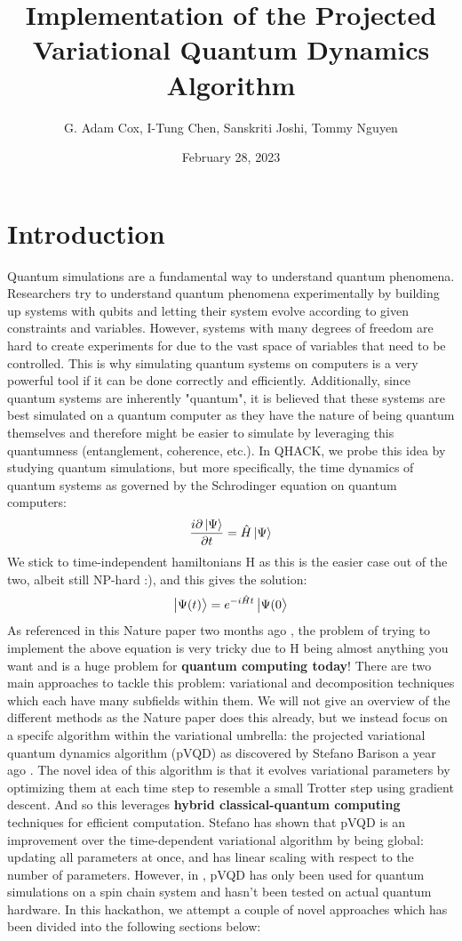 \documentclass{article}
\title{Implementation of the Projected Variational Quantum Dynamics Algorithm}
\author{G. Adam Cox, I-Tung Chen, Sanskriti Joshi, Tommy Nguyen}
\date{February 28, 2023}
\begin{document}
\maketitle

\section{Introduction}
Quantum simulations are a fundamental way to understand quantum phenomena. Researchers try to understand quantum phenomena experimentally by building up systems with qubits and letting their system evolve according to given constraints and variables. However, systems with many degrees of freedom are hard to create experiments for due to the vast space of variables that need to be controlled. This is why simulating quantum systems on computers is a very powerful tool if it can be done correctly and efficiently. Additionally, since quantum systems are inherently "quantum", it is believed that these systems are best simulated on a quantum computer as they have the nature of being quantum themselves and therefore might be easier to simulate by leveraging this quantumness (entanglement, coherence, etc.). In QHACK, we probe this idea by studying quantum simulations, but more specifically, the time dynamics of quantum systems as governed by the Schrodinger equation on quantum computers:
\begin{equation}\label{schro}
    \frac{i \partial\ket{\Psi}}{\partial t} = \hat{H} \ket{\Psi}
\end{equation}
We stick to time-independent hamiltonians H as this is the easier case out of the two, albeit still NP-hard :), and this gives the solution:
\begin{equation}\label{timeevo}
    \ket{\Psi(t)} = e^{-i\hat{H}t}\ket{\Psi(0}
\end{equation}
As referenced in this Nature paper two months ago \cite{nature_2021}, the problem of trying to implement the above equation is very tricky due to H being almost anything you want and is a huge problem for \textbf{quantum computing today}! There are two main approaches to tackle this problem: variational and decomposition techniques which each have many subfields within them. We will not give an overview of the different methods as the Nature paper does this already, but we instead focus on a specifc algorithm within the variational umbrella: the projected variational quantum dynamics algorithm (pVQD) as discovered by Stefano Barison a year ago \cite{Barison_2021}. The novel idea of this algorithm is that it evolves variational parameters by optimizing them at each time step to resemble a small Trotter step using gradient descent. And so this leverages \textbf{hybrid classical-quantum computing} techniques for efficient computation. Stefano has shown that pVQD is an improvement over the time-dependent variational algorithm \cite{PhysRevX.7.021050} by being global: updating all parameters at once, and has linear scaling with respect to the number of parameters. However, in \cite{Barison_2021}, pVQD has only been used for quantum simulations on a spin chain system and hasn't been tested on actual quantum hardware. In this hackathon, we attempt a couple of novel approaches which has been divided into the following sections below:
\end{document}

